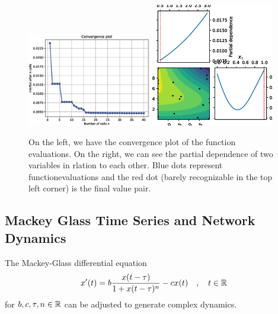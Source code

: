 \begin{figure}[H]
\begin{center}
\includegraphics[width=0.48\textwidth]{Plots/ScikitOptimizeConvergence.eps}
\includegraphics[width=0.48\textwidth]{Plots/ScikitOptimizeObjective.eps}
\end{center}
\caption{On the left, we have the convergence plot of the function evaluations. On the right, we can see the partial dependence of two variables in rlation to each other. Blue dots represent functionevaluations and the red dot (barely recognizable in the top left corner) is the final value pair.}
\label{FIG:ScikitExample}
\end{figure}




\subsection{Mackey Glass Time Series and Network Dynamics}

The Mackey-Glass differential equation \citep{MackeyGlass2010Scholar}
\begin{equation}
x'(t) = b \frac{x(t-\tau)}{1+x(t-\tau)^n}-c x(t) \quad , \quad t \in \mathbb{R}
\end{equation}
for $b, c, \tau, n \in \mathbb{R}$ can be adjusted to generate complex dynamics. 

